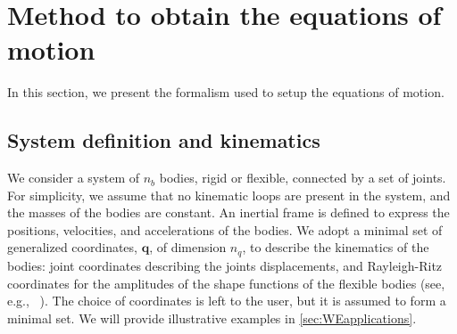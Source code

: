 \documentclass[wes, manuscript]{copernicus}
\renewcommand{\v}[1]{\boldsymbol{#1}}
\begin{document}
\section{Method to obtain the equations of motion}
\label{sec:method}

In this section, we present the formalism used to setup the equations of motion. 




\subsection{System definition and kinematics}
We consider a system of $n_b$ bodies, rigid or flexible, connected by a set of joints.
For simplicity, we assume that no kinematic loops are present in the system, and the masses of the bodies are constant.
An inertial frame is defined to express the positions, velocities, and accelerations of the bodies.
We adopt a minimal set of generalized coordinates, $\v{q}$, of dimension $n_q$, to describe the kinematics of the bodies: joint coordinates describing the joints displacements, and Rayleigh-Ritz coordinates for the amplitudes of the shape functions of the flexible bodies (see, e.g., ~\cite{branlard:2019flex}).
The choice of coordinates is left to the user, but it is assumed to form a minimal set.
We will provide illustrative examples in \autoref{sec:WEapplications}.
\end{document}
